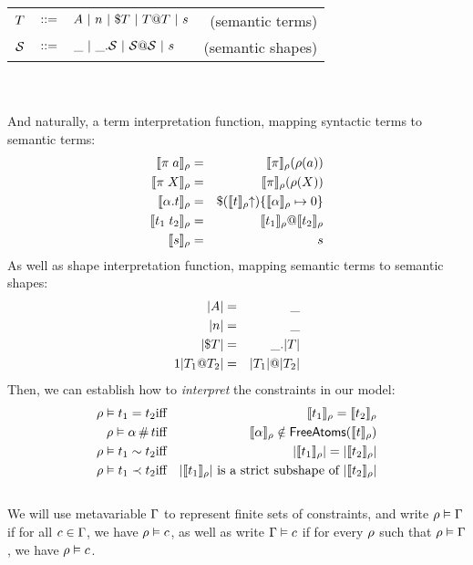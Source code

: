 \documentclass[english, mgr]{iithesis}
\renewcommand{\it}[1]{\textit{#1}}
\begin{document}
\begin{tabular}{rclr}
$T$ & $::=$ & $A
               \ |\  n
               \ |\  \$ T
               \ |\  T @ T
               \ |\  s$
    & (semantic terms) \\
$\mathcal{S}$   & $::=$ & $\_
               \ |\  \_. \mathcal{S}
               \ |\  \mathcal{S} @ \mathcal{S}
               \ |\  s$
    & (semantic shapes)
\end{tabular}
\\ \\
And naturally, a term interpretation function, mapping syntactic terms to semantic terms:
\begin{eqnarray*}
  \llbracket \pi \; a \rrbracket_{\rho} & = &
    \llbracket \pi \rrbracket_{\rho}(\rho(a)) \\
  \llbracket \pi \; X \rrbracket_{\rho} & = &
    \llbracket \pi \rrbracket_{\rho}(\rho(X)) \\
  \llbracket \alpha. t \rrbracket_{\rho} & = &
    \$ (\llbracket t \rrbracket_{\rho} \kern-3pt \uparrow)
      \{\llbracket \alpha \rrbracket_{\rho}\mapsto0\} \\
  \llbracket t_1 \; t_2 \rrbracket_{\rho} & = &
    \llbracket t_1 \rrbracket_{\rho} @ \llbracket t_2 \rrbracket_{\rho} \\
  \llbracket s \rrbracket_{\rho} & = & s
\end{eqnarray*}
As well as shape interpretation function, mapping semantic terms to semantic shapes:
\begin{eqnarray*}
  |A|                     & = & \_ \\
  |n|                            & = & \_ \\
  |\$ T|             & = & \_. |T| \\1
  |T_1 @ T_2| & = &
    |T_1| @ |T_2|
\end{eqnarray*}
Then, we can establish how to \it{interpret} the constraints in our model:
\begin{eqnarray*}
  \rho \vDash t_1 = t_2 & \textrm{iff} &
    \llbracket t_1 \rrbracket_{\rho} = \llbracket t_2 \rrbracket_{\rho} \\
  \rho \vDash \alpha \,\#\, t & \textrm{iff} &
    \llbracket \alpha \rrbracket_{\rho} \notin
      \mathsf{FreeAtoms}(\llbracket t \rrbracket_{\rho}) \\
  \rho \vDash t_1 \sim t_2 & \textrm{iff} &
    |\llbracket t_1 \rrbracket_{\rho}| = |\llbracket t_2 \rrbracket_{\rho}| \\
  \rho \vDash t_1 \prec t_2 & \textrm{iff} &
    |\llbracket t_1 \rrbracket_{\rho}| \textrm{ is a strict subshape of }
      |\llbracket t_2 \rrbracket_{\rho}|
\end{eqnarray*}
\\
We will use metavariable $\Gamma$ to represent finite sets of constraints,
and write $\rho \vDash \Gamma$ if for all $c \in \Gamma$,
we have $\rho \vDash c$,
as well as write $\Gamma \vDash c$ if for every $\rho$ such that $\rho \vDash \Gamma$,
we have $\rho \vDash c$.
\end{document}
